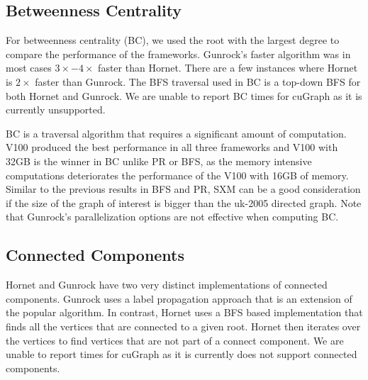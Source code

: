 

\subsection{Betweenness Centrality}

For betweenness centrality (BC), we used the root with the largest degree to compare the performance of the frameworks. Gunrock's faster algorithm was in most cases $3\times-4\times$ faster than Hornet. There are a few instances where Hornet is $2\times$ faster than Gunrock. The BFS traversal used in BC is a top-down BFS for both Hornet and Gunrock. We are unable to report BC times for cuGraph as it is currently unsupported.

BC is a traversal algorithm that requires a significant amount of computation. V100 produced the best performance in all three frameworks and V100 with 32GB is the winner in BC unlike PR or BFS, as the memory intensive computations deteriorates the performance of the V100 with 16GB of memory. Similar to the previous results in BFS and PR, SXM can be a good consideration if the size of the graph of interest is bigger than the uk-2005 directed graph. Note that Gunrock's parallelization options are not effective when computing BC.


\subsection{Connected Components}

Hornet and Gunrock have two very distinct implementations of connected components. Gunrock uses a label propagation approach that is an extension of the popular \cite{ShiloachVishkin} algorithm. In contrast, Hornet uses a BFS based implementation that finds all the vertices that are connected to a given root. Hornet then iterates over the vertices to find vertices that are not part of a connect component. %
We are unable to report times for cuGraph as it is currently does not support connected components.

